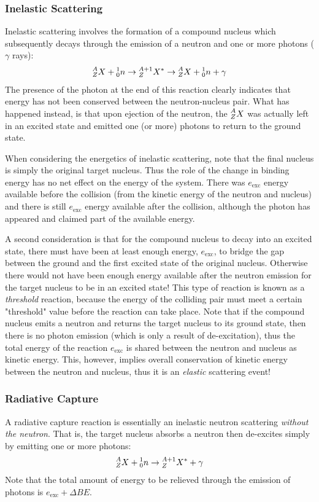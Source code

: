 \documentclass[11pt]{article}
\newcommand\leftidx[3]{{\vphantom{#2}}#1#2#3}
\begin{document}
\subsubsection{Inelastic Scattering}
\label{sec:orgheadline6}
Inelastic scattering involves the formation of a compound nucleus which subsequently decays through the emission of a neutron and one or more photons (\(\gamma\) rays):
\begin{align}
  \leftidx{^A_Z}{X}{} + \leftidx{^1_0}{n}{} 
  \rightarrow \leftidx{^{A+1}_Z}{X}{^*}
  \rightarrow \leftidx{^A_Z}{X}{} + \leftidx{^1_0}{n}{} + \gamma
\end{align}
The presence of the photon at the end of this reaction clearly indicates that energy has not been conserved between the neutron-nucleus pair.  What has happened instead, is that upon ejection of the neutron, the \(\leftidx{^A_Z}{X}{}\) was actually left in an excited state and emitted one (or more) photons to return to the ground state.

When considering the energetics of inelastic scattering, note that the final nucleus is simply the original target nucleus.  Thus the role of the change in binding energy has no net effect on the energy of the system.  There was \(e_\text{exc}\) energy available before the collision (from the kinetic energy of the neutron and nucleus) and there is still \(e_\text{exc}\) energy available after the collision, although the photon has appeared and claimed part of the available energy.

A second consideration is that for the compound nucleus to decay into an excited state, there must have been at least enough energy, \(e_\text{exc}\), to bridge the gap between the ground and the first excited state of the original nucleus.  Otherwise there would not have been enough energy available after the neutron emission for the target nucleus to be in an excited state!  This type of reaction is known as a \emph{threshold} reaction, because the energy of the colliding pair must meet a certain "threshold" value before the reaction can take place.  Note that if the compound nucleus emits a neutron and returns the target nucleus to its ground state, then there is no photon emission (which is only a result of de-excitation), thus the total energy of the reaction \(e_\text{exc}\) is shared between the neutron and nucleus as kinetic energy.  This, however, implies overall conservation of kinetic energy between the neutron and nucleus, thus it is an \emph{elastic} scattering event!

\subsubsection{Radiative Capture}
\label{sec:orgheadline7}
A radiative capture reaction is essentially an inelastic neutron scattering \emph{without the neutron}.  That is, the target nucleus absorbs a neutron then de-excites simply by emitting one or more photons:
\begin{align}
  \leftidx{^A_Z}{X}{} + \leftidx{^1_0}{n}{} 
  \rightarrow \leftidx{^{A+1}_Z}{X}{^*} + \gamma
\end{align}
Note that the total amount of energy to be relieved through the emission of photons is \(e_{\text{exc}} + \Delta BE\).
\end{document}
